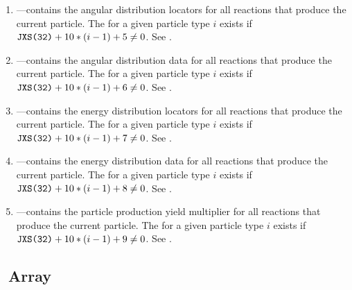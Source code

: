 \begin{enumerate}
  \item \textbf{}---contains the angular distribution locators for all reactions that produce the current particle. The  for a given particle type $i$ exists if $\texttt{JXS(32)}+10*(i-1) + 5 \neq 0$. See .
  \item \textbf{}---contains the angular distribution data for all reactions that produce the current particle. The  for a given particle type $i$ exists if $\texttt{JXS(32)}+10*(i-1) + 6 \neq 0$. See .
  \item \textbf{}---contains the energy distribution locators for all reactions that produce the current particle. The  for a given particle type $i$ exists if $\texttt{JXS(32)}+10*(i-1) + 7 \neq 0$. See .
  \item \textbf{}---contains the energy distribution data for all reactions that produce the current particle. The  for a given particle type $i$ exists if $\texttt{JXS(32)}+10*(i-1) + 8 \neq 0$. See .
  \item \textbf{}---contains the particle production yield multiplier for all reactions that produce the current particle. The  for a given particle type $i$ exists if $\texttt{JXS(32)}+10*(i-1) + 9 \neq 0$. See .
\end{enumerate}

\clearpage
\subsection{\NXS\ Array}\label{sec:NXSContinuousEnergyNeutron}


